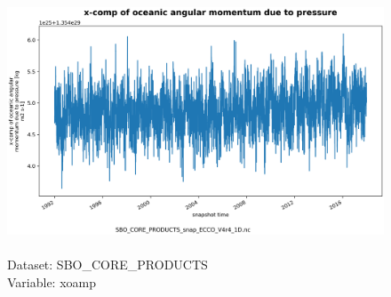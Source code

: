 \begin{figure}[H]
\centering
\includegraphics[scale=0.5]{../images/plots/oneD_plots/SBO_Core_Products/xoamp.png}
\caption{\\Dataset: SBO\_CORE\_PRODUCTS\\Variable: xoamp}
\label{tab:table-SBO_CORE_PRODUCTS_xoamp-Plot}
\end{figure}
\pagebreak
